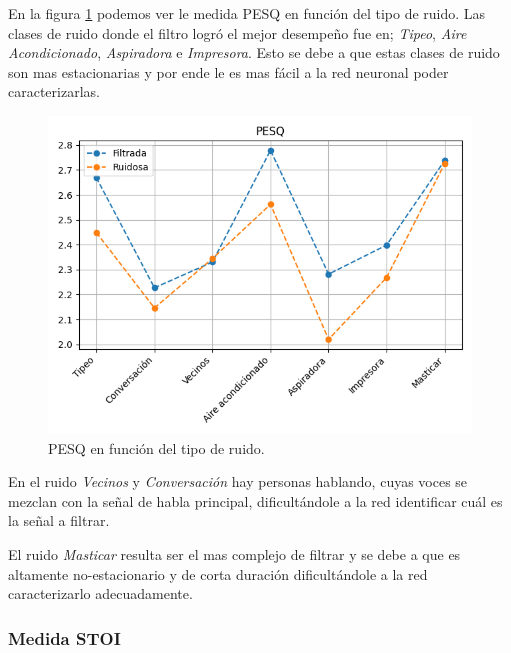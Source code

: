 

En la figura \ref{fig:ch7_pesq_by_noise_type} podemos ver le medida PESQ en función del tipo de ruido. Las clases de ruido donde el filtro logró el mejor desempeño fue en; \emph{Tipeo}, \emph{Aire Acondicionado}, \emph{Aspiradora} e \emph{Impresora}. Esto se debe a que estas clases de ruido son mas estacionarias y por ende le es mas fácil a la red neuronal poder caracterizarlas.

\begin{figure}
	\centering
	\centerline{\includegraphics[scale=0.75]{images/ch7/pesq_by_noise_type.png}}
	\caption{PESQ en función del tipo de ruido.}
	\label{fig:ch7_pesq_by_noise_type}
\end{figure} 


En el ruido \emph{Vecinos} y \emph{Conversación} hay personas hablando, cuyas voces se mezclan con la señal de habla principal, dificultándole a la red identificar cuál es la señal a filtrar.

El ruido \emph{Masticar} resulta ser el mas complejo de filtrar y se debe a que es altamente no-estacionario y de corta duración dificultándole a la red caracterizarlo adecuadamente. 

\subsubsection{Medida STOI}

